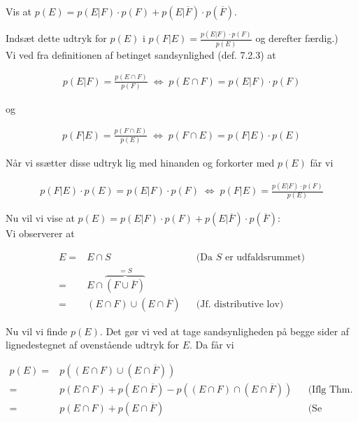 \documentclass[12pt]{article}
\begin{document}
Vis at $p(E)=p(E|F) \cdot p(F) + p(E|\overline{F}) \cdot p(\overline{F})$.

Indsæt dette udtryk for $p(E)$ i $p(F|E) = \frac{p(E|F) \cdot p(F)}{p(E)}$ og derefter færdig.) \\

Vi ved fra definitionen af betinget sandsynlighed (def. 7.2.3) at 

\begin{align*}
    p(E|F) = \frac{p(E \cap F)}{p(F)} \; \Leftrightarrow \; p(E \cap F) = p(E|F) \cdot p(F)
\end{align*}

og 

\begin{align*}
    p(F|E)=\frac{p(F \cap E)}{p(E)} \; \Leftrightarrow \; p(F \cap E)=p(F|E) \cdot p(E)
\end{align*}

Når vi ssætter disse udtryk lig med hinanden og forkorter med $p(E)$ får vi

\begin{align}
   p(F|E) \cdot p(E) =  p(E|F) \cdot p(F) \; \Leftrightarrow \; p(F|E) = \frac{p(E|F) \cdot p(F)}{p(E)}
\end{align}

Nu vil vi vise at $p(E)=p(E|F) \cdot p(F) + p(E | \overline{F}) \cdot p(\overline{F})$: \\

Vi observerer at 

\begin{align*}
    E =& E \cap S && \text{(Da } S \text{ er udfaldsrummet)} \\
    =& E \cap \overbrace{(F \cup \overline{F})}^{=S} \\
    =& (E \cap F) \cup (E \cap \overline{F}) && \text{(Jf. distributive lov)}
\end{align*}

Nu vil vi finde $p(E)$. Det gør vi ved at tage sandsynligheden på begge sider af lignedestegnet af ovenstående udtryk for $E$. Da får vi

\begin{align*}
    p(E) =& p((E \cap F) \cup (E \cap \overline{F})) \\
    =& p(E \cap F) + p(E \cap \overline{F}) - p((E \cap F) \cap (E \cap \overline{F})) && \text{(Iflg Thm. 7.1.2)} \\
    =& p(E \cap F) + p(E \cap \overline{F}) && \text{(Se nedenfor)}
\end{align*}
\end{document}
